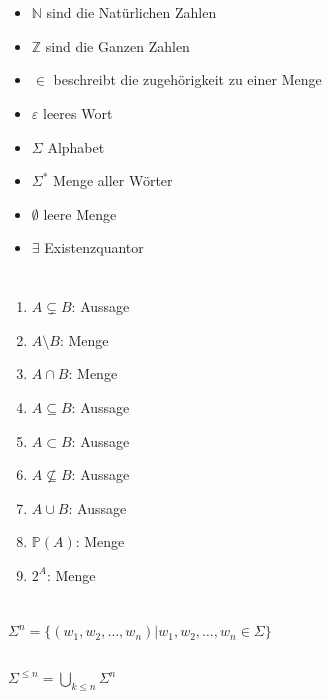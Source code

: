 \documentclass{article}
\begin{document}
\section{}
\begin{itemize}
    \item{$\mathbb N$ sind die Natürlichen Zahlen}
    \item{$\mathbb Z$ sind die Ganzen Zahlen}
    \item{$\in$ beschreibt die zugehörigkeit zu einer Menge}
    \item{$\varepsilon$ leeres Wort}
    \item{$\Sigma$ Alphabet}
    \item{$\Sigma^*$ Menge aller Wörter}
    \item{$\emptyset$ leere Menge}
    \item{$\exists$ Existenzquantor}
\end{itemize}

\section{}
\begin{enumerate}
    \item{$A \subsetneq B$: Aussage}
    \item{$A \setminus B$: Menge}
    \item{$A \cap B$: Menge}
    \item{$A \subseteq B$: Aussage}
    \item{$A \subset B$: Aussage}
    \item{$A \nsubseteq B$: Aussage}
    \item{$A \cup B$: Aussage}
    \item{$\mathbb P(A)$: Menge}
    \item{$2^A$: Menge}
\end{enumerate}

\section{}
\subsection{}
$\Sigma^n = \{(w_1, w_2, \hdots, w_n) | w_1, w_2, \hdots, w_n \in \Sigma\}$

\subsection{}
$\Sigma^{\leq n} = \underset{k \leq n}{\bigcup}\Sigma^n$
\end{document}
